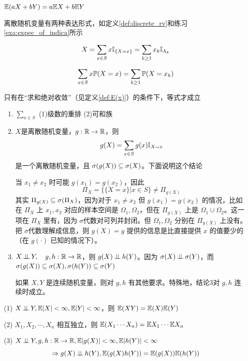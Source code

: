 \begin{theorem}
    $\mathbb E(aX+bY)=a\mathbb E X+b\mathbb E Y$
\end{theorem}

离散随机变量有两种表达形式，如定义\ref{def:discrete_rv}和练习\ref{exa:expec_of_indica}所示

\[
X=\sum_{x\in S}x\mathbb I_{\{X=x\}}=\sum_{k\geq 1}x_k\mathbb I_{\Lambda_k}
\]

\[
\sum_{x\in S}x\mathbb{P}(X=x)=\sum_{k\geq 1}\mathbb{P}(X=x_k)
\]

只有在“求和绝对收敛”（见定义\ref{def:E(x)}）的条件下，等式才成立

\begin{remark}
    \quad 

    \begin{enumerate}
        \item $\sum_{x\in S}$ (1)级数的重排 (2)可和族
        \item $X$是离散随机变量，$g:\mathbb{R}\rightarrow\mathbb{R}$，则 
        \[
        g(X)=\sum_{x\in S}g(x)\mathbb I_{X=x}
        \]
        是一个离散随机变量，且 $\sigma(g(X))\subseteq \sigma(X)$。下面说明这个结论

        当 $x_1\neq x_2$ 时可能 $g(x_1)=g(x_2)$，因此
        \[
        \Pi_X=\{\{X=x\}|x\in S\}\neq \Pi_{g(X)}
        \]
        其实 $\Pi_{g(X)}\subseteq \sigma(\Pi_X)$，因为对于 $x_1\neq x_2$ 但 $g(x_1)=g(x_2)$ 的情况，比如在 $\Pi_X$ 上 $x_1,x_2$ 对应的样本空间是 $\Omega_1,\Omega_2$，但在 $\Pi_{g(X)}$ 上是 $\Omega_1\cup \Omega_2$。这一项在 $\Pi_X$ 里有，因为 $\sigma$代数对可列并封闭。但 $\Omega_1,\Omega_2$ 分别在 $\Pi_{g(X)}$ 上没有。把 $\sigma$代数理解成信息，则 $g(X)=y$ 提供的信息是比直接提供 $x$ 的值要少的（在 $g(\cdot)$ 已知的情况下）。

        \item $X\operatorname{\perp\!\!\!\perp} Y,\quad g, h:\mathbb{R}\rightarrow \mathbb{R}$，则 $g(X)\operatorname{\perp\!\!\!\perp} h(Y)$。因为 $\sigma(X)\operatorname{\perp\!\!\!\perp} \sigma(Y)$，而 $\sigma(g(X))\subseteq \sigma(X), \sigma(h(Y))\subseteq \sigma(Y)$
        
        如果 $X,Y$ 是连续随机变量，则对 $g,h$ 有其他要求。特殊地，结论3对 $g,h$ 连续时成立。
    \end{enumerate}
\end{remark}

\begin{theorem}
    (1) $X\operatorname{\perp\!\!\!\perp} Y, \mathbb E|X|<\infty, \mathbb E|Y|<\infty$，则 $\mathbb E(XY)=\mathbb E(X)\mathbb E(Y)$

    (2) $X_1,X_2,\cdots,X_n$ 相互独立，则 $\mathbb E(X_1\cdots X_n)=\mathbb E X_1\cdots \mathbb E X_n$

    (3) $X\operatorname{\perp\!\!\!\perp} Y, g,h:\mathbb{R}\rightarrow\mathbb{R}, \mathbb E|g(X)|<\infty, \mathbb E|h(Y)|<\infty$
    \[
    \Rightarrow g(X)\operatorname{\perp\!\!\!\perp} h(Y), \mathbb E(g(X)h(Y))=\mathbb E(g(X))\mathbb E(h(Y))
    \]
\end{theorem}

